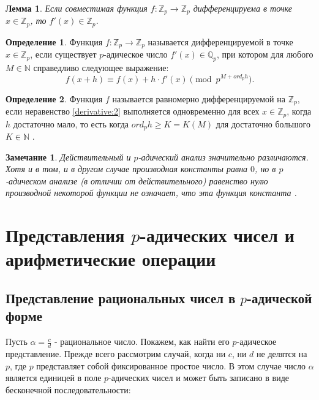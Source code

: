 \documentclass[master, och, diploma, times]{sty/SCWorks}
\theoremstyle{plain}
\newtheorem{lemma}{Лемма}[section]
\newtheorem{note}{Замечание}[section]
\theoremstyle{definition}
\newtheorem{defn}{Определение}[section]
\numberwithin{equation}{section}
\begin{document}
\begin{lemma}
Если совместимая функция $f:\mathbb {Z}_p \rightarrow \mathbb {Z}_p$ дифференцируема в точке $x \in \mathbb {Z}_p$, то $f'(x) \in \mathbb {Z}_p$.
\end{lemma}

\begin{defn}
Функция $f:\mathbb {Z}_p \rightarrow \mathbb {Z}_p$ называется дифференцируемой в точке $x \in \mathbb {Z}_p$, если существует $p$-адическое число $f'(x) \in \mathbb {Q}_p$, при котором для любого $M \in \mathbb {N}$ справедливо следующее выражение:
\begin{equation} \label{derivative:2}
	f(x+h) \equiv f(x) + h \cdot f'(x) \pmod p^{M + ord_p h}.
\end{equation}
\end{defn}

\begin{defn}
Функция $f$ называется равномерно дифференцируемой на $\mathbb {Z}_p$, если неравенство \eqref{derivative:2} выполняется одновременно для всех $x \in \mathbb {Z}_p$, когда $h$ достаточно мало, то есть когда $ord_p h \ge K=K(M)$ для достаточно большого $K \in \mathbb {N}$ \cite{bib:analisys:vv}.
\end{defn}

\begin{note}
Действительный и $p$-адический анализ значительно различаются. Хотя и в том, и в другом случае производная константы равна $0$, но в $p$-адическом анализе (в отличии от действительного) равенство нулю производной некоторой функции не означает, что эта функция константа \cite{bib:analysis:alain}.
\end{note}

\section{Представления $p$-адических чисел и арифметические операции}

\subsection{Представление рациональных чисел в $p$-адической форме}

Пусть $\alpha=\frac{c}{d}$ - рациональное число. Покажем, как найти его $p$-адическое представление. Прежде всего рассмотрим случай, когда ни $c$, ни $d$ не делятся на $p$, где $p$ представляет собой фиксированное простое число. В этом случае число $\alpha$ является единицей в поле $p$-адических чисел и может быть записано в виде бесконечной последовательности:
\end{document}

